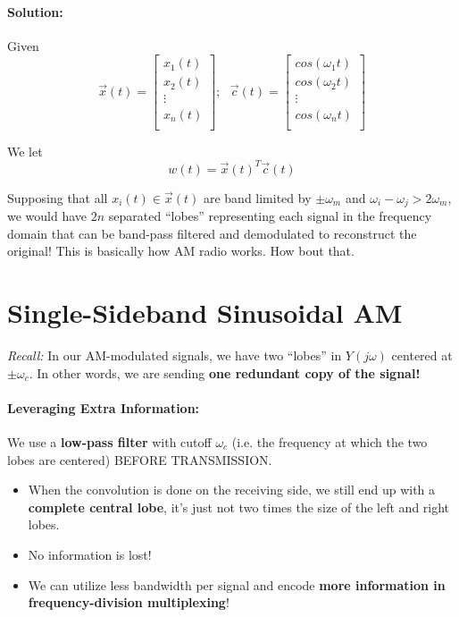 \documentclass[a4paper,12pt]{report}
\begin{document}
\paragraph{Solution: } Given 
\begin{equation}
\vec{x}(t) = \begin{bmatrix}
x_1(t) \\
x_2(t) \\
\vdots \\
x_n(t) \\
\end{bmatrix};\,\,\,\,
\vec{c}(t) = \begin{bmatrix}
cos(\omega_1 t) \\
cos(\omega_2 t) \\
\vdots \\
cos(\omega_n t) \\
\end{bmatrix}
\end{equation}

We let 
\begin{equation}
w(t) = \vec{x}(t)^T \vec{c}(t)
\end{equation}

Supposing that all $x_i(t) \in \vec{x}(t)$ are band limited by $\pm \omega_m$ and $\omega_i - \omega_j > 2\omega_m$, we would have $2n$ separated ``lobes'' representing each signal in the frequency domain that can be band-pass filtered and demodulated to reconstruct the original! This is basically how AM radio works. How bout that. 


\section{Single-Sideband Sinusoidal AM}

\textit{Recall:} In our AM-modulated signals, we have two ``lobes'' in $Y(j\omega)$ centered at $\pm \omega_c$. In other words, we are sending \textbf{one redundant copy of the signal!}

\paragraph{Leveraging Extra Information: } We use a \textbf{low-pass filter} with cutoff $\omega_c$ (i.e. the frequency at which the two lobes are centered) BEFORE TRANSMISSION.
\begin{itemize}
\item When the convolution is done on the receiving side, we still end up with a \textbf{complete central lobe}, it's just not two times the size of the left and right lobes.
\item No information is lost!
\item We can utilize less bandwidth per signal and encode \textbf{more information in frequency-division multiplexing}!
\end{itemize}
\end{document}
